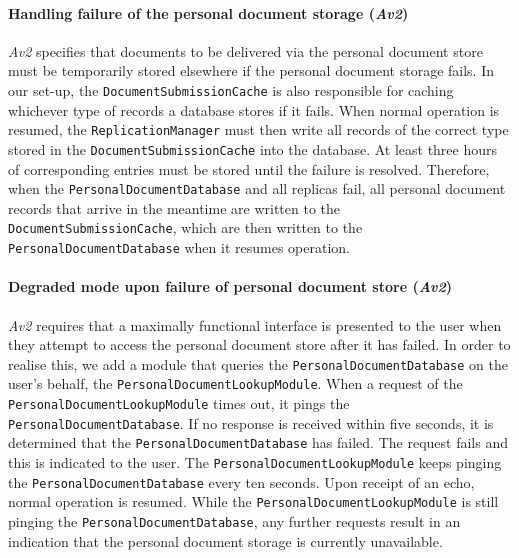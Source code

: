 \documentclass[a4paper,10pt]{article}
\begin{document}
\paragraph{Handling failure of the personal document storage (\emph{Av2})}
\emph{Av2} specifies that documents to be delivered via the personal document store must be temporarily stored elsewhere if the personal document storage fails. In our set-up, the \texttt{DocumentSubmissionCache} is also responsible for caching whichever type of records a database stores if it fails. When normal operation is resumed, the \texttt{ReplicationManager} must then write all records of the correct type stored in the \texttt{DocumentSubmissionCache} into the database. At least three hours of corresponding entries must be stored until the failure is resolved. Therefore, when the \texttt{PersonalDocumentDatabase} and all replicas fail, all personal document records that arrive in the meantime are written to the \texttt{DocumentSubmissionCache}, which are then written to the \texttt{PersonalDocumentDatabase} when it resumes operation.

\paragraph{Degraded mode upon failure of personal document store (\emph{Av2})}
\emph{Av2} requires that a maximally functional interface is presented to the user when they attempt to access the personal document store after it has failed. In order to realise this, we add a module that queries the \texttt{PersonalDocumentDatabase} on the user's behalf, the \texttt{PersonalDocumentLookupModule}. When a request of the \texttt{PersonalDocumentLookupModule} times out, it pings the \texttt{PersonalDocumentDatabase}. If no response is received within five seconds, it is determined that the \texttt{PersonalDocumentDatabase} has failed. The request fails and this is indicated to the user. The \texttt{PersonalDocumentLookupModule} keeps pinging the \texttt{PersonalDocumentDatabase} every ten seconds. Upon receipt of an echo, normal operation is resumed. While the \texttt{PersonalDocumentLookupModule} is still pinging the \texttt{PersonalDocumentDatabase}, any further requests result in an indication that the personal document storage is currently unavailable.
\end{document}
